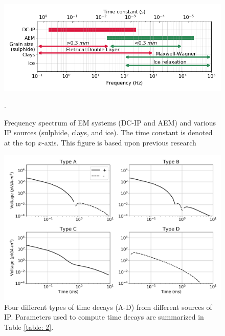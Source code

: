 \documentclass[manuscript]{geophysics}
\begin{document}
\begin{figure}[htb]
  \centering
  \includegraphics[width=1.0\textwidth]{figures/polarization_spectrum.png}
  \caption{Frequency spectrum of EM systems (DC-IP and AEM) and various IP sources (sulphide, clays, and ice). The time constant is denoted at the top $x$-axis. This figure is based upon previous research \cite[]{pelton1978,Revil2013a,grimm2015,macnae2016b}}.
  \label{fig:11}
\end{figure}

\begin{figure}[htb]
  \centering
  \includegraphics[width=1.0\textwidth]{figures/type_curves.png}
  \caption{Four different types of time decays (A-D) from different sources of IP. Parameters used to compute time decays are summarized in Table \ref{table: 2}.}
  \label{fig:12}
\end{figure}
\end{document}
